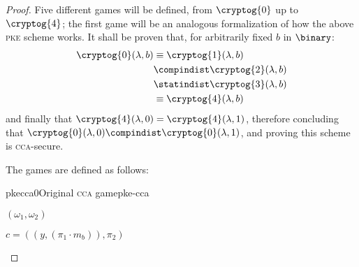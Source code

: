 \begin{proof}
    Five different games will be defined, from $\cryptog{0}$ up to $\cryptog{4}$; the first game will be an analogous formalization of how the above \textsc{pke} scheme works. It shall be proven that, for arbitrarily fixed $b$ in $\binary$:
    \begin{align*}
        \cryptog{0}(\lambda, b) &\equiv \cryptog{1}(\lambda, b)         \\
                                &\compindist \cryptog{2}(\lambda, b)    \\
                                &\statindist \cryptog{3}(\lambda, b)    \\
                                &\equiv \cryptog{4}(\lambda, b)
    \end{align*}
    and finally that $\cryptog{4}(\lambda, 0) = \cryptog{4}(\lambda, 1)$, therefore concluding that $\cryptog{0}(\lambda, 0) \compindist \cryptog{0}(\lambda, 1)$, and proving this scheme is \textsc{cca}-secure.


    The games are defined as follows:

    \begin{cryptogame}{pkecca0}{Original \textsc{cca} game}{pke-cca}
    
        {$(\omega_1, \omega_2)$}
        {}
    
        \send{}{}{}
        \receive{}{}{}
    
        \cseqdelay
    
        {$c = ((y, (\pi_1 \cdot m_b)), \pi_2)$}
        {}
    
        \cseqdelay
    

\end{cryptogame}
\end{proof}
